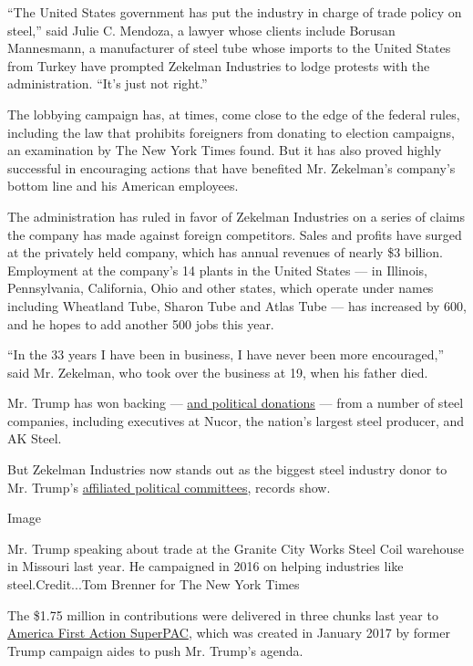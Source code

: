 ``The United States government has put the industry in charge of trade
policy on steel,'' said Julie C. Mendoza, a lawyer whose clients include
Borusan Mannesmann, a manufacturer of steel tube whose imports to the
United States from Turkey have prompted Zekelman Industries to lodge
protests with the administration. ``It's just not right.''

The lobbying campaign has, at times, come close to the edge of the
federal rules, including the law that prohibits foreigners from donating
to election campaigns, an examination by The New York Times found. But
it has also proved highly successful in encouraging actions that have
benefited Mr. Zekelman's company's bottom line and his American
employees.

The administration has ruled in favor of Zekelman Industries on a series
of claims the company has made against foreign competitors. Sales and
profits have surged at the privately held company, which has annual
revenues of nearly \$3 billion. Employment at the company's 14 plants in
the United States --- in Illinois, Pennsylvania, California, Ohio and
other states, which operate under names including Wheatland Tube, Sharon
Tube and Atlas Tube --- has increased by 600, and he hopes to add
another 500 jobs this year.

``In the 33 years I have been in business, I have never been more
encouraged,'' said Mr. Zekelman, who took over the business at 19, when
his father died.

Mr. Trump has won backing ---
\href{https://www.opensecrets.org/2020-presidential-race/contributors?id=N00023864}{and
political donations} --- from a number of steel companies, including
executives at Nucor, the nation's largest steel producer, and AK Steel.

But Zekelman Industries now stands out as the biggest steel industry
donor to Mr. Trump's
\href{https://www.opensecrets.org/pacs/pacgave2.php?cycle=2018\&cmte=C00637512}{affiliated
political committees}, records show.

Image

Mr. Trump speaking about trade at the Granite City Works Steel Coil
warehouse in Missouri last year. He campaigned in 2016 on helping
industries like steel.Credit...Tom Brenner for The New York Times

The \$1.75 million in contributions were delivered in three chunks last
year to \href{https://www.a1apac.org/}{America First Action SuperPAC},
which was created in January 2017 by former Trump campaign aides to push
Mr. Trump's agenda.

